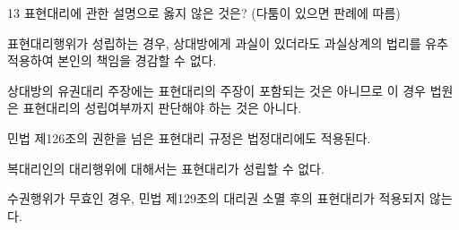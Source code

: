 \begin{question}{13}
표현대리에 관한 설명으로 옳지 않은 것은? (다툼이 있으면 판례에 따름)
\begin{choices}
  \item 표현대리행위가 성립하는 경우, 상대방에게 과실이 있더라도 과실상계의 법리를 유추 적용하여 본인의 책임을 경감할 수 없다.
  \item 상대방의 유권대리 주장에는 표현대리의 주장이 포함되는 것은 아니므로 이 경우 법원은 표현대리의 성립여부까지 판단해야 하는 것은 아니다.
  \item 민법 제126조의 권한을 넘은 표현대리 규정은 법정대리에도 적용된다.
  \item 복대리인의 대리행위에 대해서는 표현대리가 성립할 수 없다.
  \item 수권행위가 무효인 경우, 민법 제129조의 대리권 소멸 후의 표현대리가 적용되지 않는다.
\end{choices}
\end{question}
